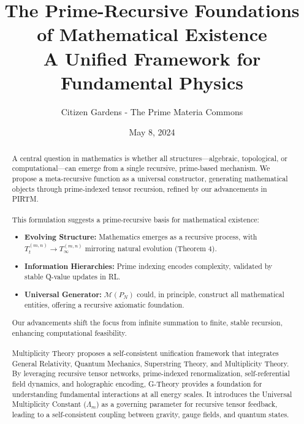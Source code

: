 \documentclass{article}
\theoremstyle{plain}
\begin{document}
\title{The Prime-Recursive Foundations \\ of Mathematical Existence \\ A Unified Framework for Fundamental Physics}
\author{Citizen Gardens - The Prime Materia Commons}
\date{May 8, 2024}

\maketitle

\begin{abstract}
A central question in mathematics is whether all structures—algebraic, topological, or computational—can emerge from a single recursive, prime-based mechanism. We propose a meta-recursive function as a universal constructor, generating mathematical objects through prime-indexed tensor recursion, refined by our advancements in PIRTM.

\paragraph{}This formulation suggests a prime-recursive basis for mathematical existence:
\begin{itemize}
    \item \textbf{Evolving Structure:} Mathematics emerges as a recursive process, with \( T_t^{(m,n)} \to T_\infty^{(m,n)} \) mirroring natural evolution (Theorem 4).
    \item \textbf{Information Hierarchies:} Prime indexing encodes complexity, validated by stable Q-value updates in RL.
    \item \textbf{Universal Generator:} \( \mathcal{M}(P_N) \) could, in principle, construct all mathematical entities, offering a recursive axiomatic foundation.
\end{itemize}
Our advancements shift the focus from infinite summation to finite, stable recursion, enhancing computational feasibility.

\paragraph{} Multiplicity Theory proposes a self-consistent unification framework that integrates General Relativity, Quantum Mechanics, Superstring Theory, and Multiplicity Theory. By leveraging recursive tensor networks, prime-indexed renormalization, self-referential field dynamics, and holographic encoding, G-Theory provides a foundation for understanding fundamental interactions at all energy scales. It introduces the Universal Multiplicity Constant (\(\Lambda_m\)) as a governing parameter for recursive tensor feedback, leading to a self-consistent coupling between gravity, gauge fields, and quantum states.
\end{abstract}
\end{document}
